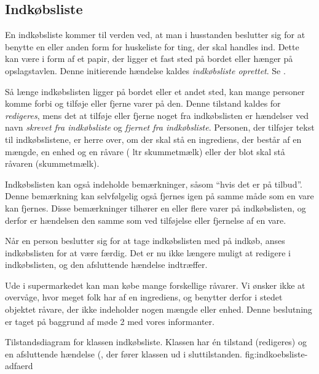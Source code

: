 \subsection{Indkøbsliste}
En indkøbsliste kommer til verden ved, at man i husstanden beslutter sig for at benytte en eller anden form for huskeliste for ting, der skal handles ind. Dette kan være i form af et papir, der ligger et fast sted på bordet eller hænger på opslagstavlen. Denne initierende hændelse kaldes \textit{indkøbsliste oprettet}. Se .

Så længe indkøbslisten ligger på bordet eller et andet sted, kan mange personer komme forbi og tilføje eller fjerne varer på den. Denne tilstand kaldes for \textit{redigeres}, mens det at tilføje eller fjerne noget fra indkøbslisten er hændelser ved navn \textit{skrevet fra indkøbsliste} og \textit{fjernet fra indkøbsliste}. Personen, der tilføjer tekst til indkøbslistene, er herre over, om der skal stå en ingrediens, der består af en mængde, en enhed og en råvare ( ltr skummetmælk) eller der blot skal stå råvaren (\fx skummetmælk).

Indkøbslisten kan også indeholde bemærkninger, såsom ``hvis det er på tilbud''. Denne bemærkning kan selvfølgelig også fjernes igen på samme måde som en vare kan fjernes. Disse bemærkninger tilhører en eller flere varer på indkøbslisten, og derfor er hændelsen den samme som ved tilføjelse eller fjernelse af en vare.

Når en person beslutter sig for at tage indkøbslisten med på indkøb, anses indkøbslisten for at være færdig. Det er nu ikke længere muligt at redigere i indkøbslisten, og den afsluttende hændelse indtræffer. 

Ude i supermarkedet kan man købe mange forskellige råvarer. Vi ønsker ikke at overvåge, hvor meget folk har af en ingrediens, og benytter derfor i stedet objektet råvare, der ikke indeholder nogen mængde eller enhed. Denne beslutning er taget på baggrund af møde 2 med vores informanter.

  {Tilstandsdiagram for klassen indkøbsliste. Klassen har én tilstand (redigeres) og en afsluttende hændelse (, der fører klassen ud i sluttilstanden.}
  {fig:indkoebsliste-adfaerd}
